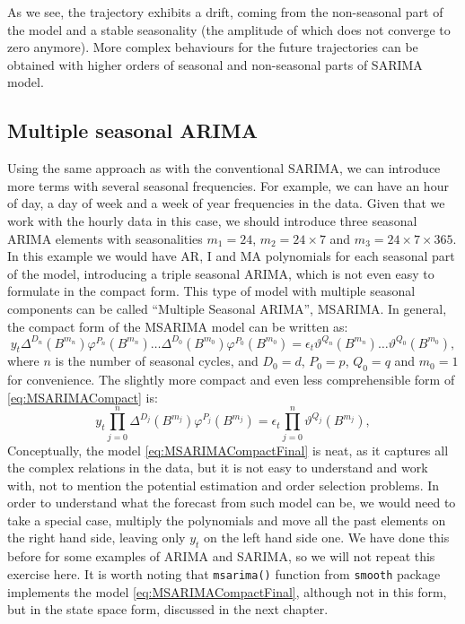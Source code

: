 \documentclass[
]{book}
\theoremstyle{definition}
\theoremstyle{definition}
\theoremstyle{definition}
\theoremstyle{definition}
\theoremstyle{remark}
\begin{document}
As we see, the trajectory exhibits a drift, coming from the non-seasonal part of the model and a stable seasonality (the amplitude of which does not converge to zero anymore). More complex behaviours for the future trajectories can be obtained with higher orders of seasonal and non-seasonal parts of SARIMA model.

\hypertarget{MSARIMA}{%
\subsection{Multiple seasonal ARIMA}\label{MSARIMA}}

Using the same approach as with the conventional SARIMA, we can introduce more terms \citep[similar to how it was done by][]{Taylor2003a} with several seasonal frequencies. For example, we can have an hour of day, a day of week and a week of year frequencies in the data. Given that we work with the hourly data in this case, we should introduce three seasonal ARIMA elements with seasonalities \(m_1=24\), \(m_2=24 \times 7\) and \(m_3=24 \times 7 \times 365\). In this example we would have AR, I and MA polynomials for each seasonal part of the model, introducing a triple seasonal ARIMA, which is not even easy to formulate in the compact form. This type of model with multiple seasonal components can be called ``Multiple Seasonal ARIMA'', MSARIMA. In general, the compact form of the MSARIMA model can be written as:
\begin{equation}
  y_t \Delta^{D_n}(B^{m_n}) \varphi^{P_n}(B^{m_n}) \dots \Delta^{D_0}(B^{m_0}) \varphi^{P_0}(B^{m_0}) = \epsilon_t \vartheta^{Q_n}(B^{m_n}) \dots \vartheta^{Q_0}(B^{m_0}) ,
  \label{eq:MSARIMACompact}
\end{equation}
where \(n\) is the number of seasonal cycles, and \(D_0=d\), \(P_0=p\), \(Q_0=q\) and \(m_0=1\) for convenience. The slightly more compact and even less comprehensible form of \eqref{eq:MSARIMACompact} is:
\begin{equation}
  y_t \prod_{j=0}^n \Delta^{D_j} (B^{m_j}) \varphi^{P_j}(B^{m_j}) = \epsilon_t \prod_{j=0}^n \vartheta^{Q_j}(B^{m_j}) ,
  \label{eq:MSARIMACompactFinal}
\end{equation}
Conceptually, the model \eqref{eq:MSARIMACompactFinal} is neat, as it captures all the complex relations in the data, but it is not easy to understand and work with, not to mention the potential estimation and order selection problems. In order to understand what the forecast from such model can be, we would need to take a special case, multiply the polynomials and move all the past elements on the right hand side, leaving only \(y_t\) on the left hand side one. We have done this before for some examples of ARIMA and SARIMA, so we will not repeat this exercise here. It is worth noting that \texttt{msarima()} function from \texttt{smooth} package implements the model \eqref{eq:MSARIMACompactFinal}, although not in this form, but in the state space form, discussed in the next chapter.
\end{document}
